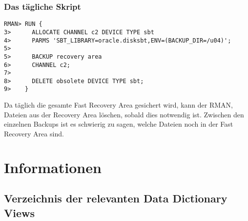         \subsubsection{Das tägliche Skript}
          \begin{lstlisting}[caption={Das tägliche Skript},label=admin1364,language=rman]
RMAN> RUN {
3>      ALLOCATE CHANNEL c2 DEVICE TYPE sbt
4>      PARMS 'SBT_LIBRARY=oracle.disksbt,ENV=(BACKUP_DIR=/u04)';
5>
5>      BACKUP recovery area
6>      CHANNEL c2;
7>
8>      DELETE obsolete DEVICE TYPE sbt;
9>    }
          \end{lstlisting}
          Da täglich die gesamte Fast Recovery Area gesichert wird, kann der RMAN, Dateien aus der Recovery Area löschen, sobald dies notwendig ist. Zwischen den einzelnen Backups ist es schwierig zu sagen, welche Dateien noch in der Fast Recovery Area sind.
    \section{Informationen}
      \subsection{Verzeichnis der relevanten Data Dictionary Views}
        \begin{literaturinternet}
          \item \cite{REFRN30022}
          \item \cite{REFRN30030}
        \end{literaturinternet}
\clearpage
